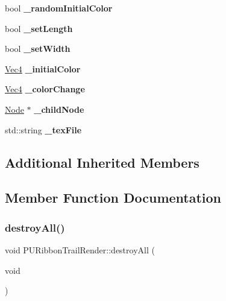 \begin{DoxyCompactItemize}
\item 
\mbox{\label{classPURibbonTrailRender_ad4cc24bc35f30e54701befcd5d1bf163}} 
bool {\bfseries \+\_\+random\+Initial\+Color}
\item 
\mbox{\label{classPURibbonTrailRender_a55845f924dab5f85db32e7609b67a6f1}} 
bool {\bfseries \+\_\+set\+Length}
\item 
\mbox{\label{classPURibbonTrailRender_aa2595e37db7db99ad347467a76e45476}} 
bool {\bfseries \+\_\+set\+Width}
\item 
\mbox{\label{classPURibbonTrailRender_afbbc1ec2b2eca2a81206336d9514b5f5}} 
\hyperlink{classVec4}{Vec4} {\bfseries \+\_\+initial\+Color}
\item 
\mbox{\label{classPURibbonTrailRender_aa518f60af5f635440f56b121cf7f6afa}} 
\hyperlink{classVec4}{Vec4} {\bfseries \+\_\+color\+Change}
\item 
\mbox{\label{classPURibbonTrailRender_ade961cea059454044e896bebac8b7493}} 
\hyperlink{classNode}{Node} $\ast$ {\bfseries \+\_\+child\+Node}
\item 
\mbox{\label{classPURibbonTrailRender_af9ca79051db9ed27f2272838767c9f88}} 
std\+::string {\bfseries \+\_\+tex\+File}
\end{DoxyCompactItemize}
\subsection*{Additional Inherited Members}


\subsection{Member Function Documentation}
\mbox{\label{classPURibbonTrailRender_a98f209e22dc55676e0b01c609e2b5262}} 
\subsubsection{\texorpdfstring{destroy\+All()}{destroyAll()}\hspace{0.1cm}{\footnotesize\ttfamily [1/2]}}
{\footnotesize\ttfamily void P\+U\+Ribbon\+Trail\+Render\+::destroy\+All (\begin{DoxyParamCaption}\item[{void}]{ }\end{DoxyParamCaption})}

